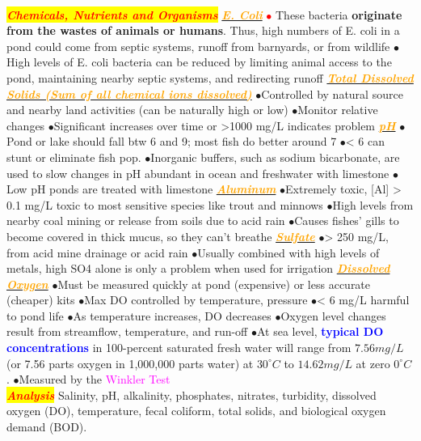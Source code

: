 \documentclass{article}
\newcommand{\ddd}{$\bullet$}
\newcommand{\red}[1]{\textcolor{red}{#1}}
\newcommand{\blue}[1]{\textcolor{blue}{#1}}
\newcommand{\pink}[1]{\textcolor{magenta}{#1}}
\newcommand{\orange}[1]{\textcolor{orange}{#1}}
\newcommand{\mysection}[1]{\colorbox{yellow}{\textbf{\textit{\red{#1}}}}}
\newcommand{\mysubsection}[1]{\underline{\textbf{{\textit{\orange{#1}}}}}}
\newcommand{\vocab}[1]{{\pink{#1}}}
\begin{document}
\begin{multicols*}{4}
            \\
    \mysection{Chemicals, Nutrients and Organisms}
        \mysubsection{E. Coli}
            \red{\ddd} These bacteria \textbf{originate from the wastes of animals or humans}. Thus, high numbers of E. coli in a pond could come from septic systems, runoff from barnyards, or from wildlife
            \ddd High levels of E. coli bacteria can be reduced by limiting animal access to the pond, maintaining nearby septic systems, and redirecting runoff
        \mysubsection{Total Dissolved Solids (Sum of all chemical ions dissolved)}
            \ddd Controlled by natural source and nearby land activities (can be naturally high or low)
            \ddd Monitor relative changes
            \ddd Significant increases over time or >1000 mg/L indicates problem
        \mysubsection{pH}
            \ddd Pond or lake should fall btw 6 and 9; most fish do better around 7
            \ddd < 6 can stunt or eliminate fish pop.
            \ddd Inorganic buffers, such as sodium bicarbonate, are used to slow changes in pH abundant in ocean and freshwater with limestone
            \ddd Low pH ponds are treated with limestone
        \mysubsection{Aluminum}
            \ddd Extremely toxic, [Al] > 0.1 mg/L toxic to most sensitive species like trout and minnows
            \ddd High levels from nearby coal mining or release from soils due to acid rain
            \ddd Causes fishes’ gills to become covered in thick mucus, so they can’t breathe
        \mysubsection{Sulfate}
            \ddd > 250 mg/L, from acid mine drainage or acid rain
            \ddd Usually combined with high levels of metals, high SO4 alone is only a problem when used for irrigation
        \mysubsection{Dissolved Oxygen}
            \ddd Must be measured quickly at pond (expensive) or less accurate (cheaper) kits
            \ddd Max DO controlled by temperature, pressure
            \ddd < 6 mg/L harmful to pond life
	        \ddd As temperature increases, DO decreases
	        \ddd Oxygen level changes result from streamflow, temperature, and run-off
	        \ddd At sea level, \textbf{\blue{typical DO concentrations}} in 100-percent saturated fresh water will range from $7.56 mg/L$ (or 7.56 parts oxygen in 1,000,000 parts water) at $30^\circ C$ to $14.62 mg/L$ at zero $0^\circ C$.
	        \ddd Measured by the \vocab{Winkler Test}
    \\
    \mysection{Analysis}
        Salinity, pH, alkalinity, phosphates, nitrates, turbidity, dissolved oxygen (DO), temperature, fecal coliform, total solids, and biological oxygen demand (BOD). 

\end{multicols*}
\end{document}
